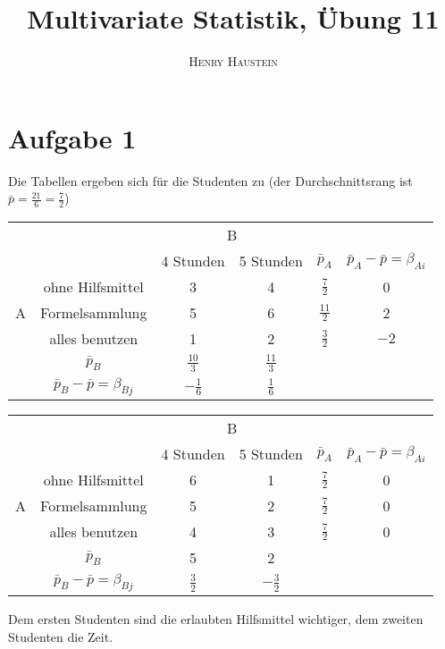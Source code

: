 \documentclass{article}
\title{\textbf{Multivariate Statistik, Übung 11}}
\author{\textsc{Henry Haustein}}
\date{}
\begin{document}
	\maketitle
	
	\section*{Aufgabe 1}
	Die Tabellen ergeben sich für die Studenten zu (der Durchschnittsrang ist $\bar{p}=\frac{21}{6}=\frac{7}{2}$)
	\begin{center}
		\begin{tabular}{cc|cc|c|c}
			&& \multicolumn{2}{c|}{B} & & \\
			&& 4 Stunden & 5 Stunden & $\bar{p}_A$ & $\bar{p}_A-\bar{p} = \beta_{Ai}$ \\
			\hline
			& ohne Hilfsmittel & 3 & 4 & $\frac{7}{2}$ & 0 \\
			A & Formelsammlung & 5 & 6 & $\frac{11}{2}$ & 2 \\
			& alles benutzen & 1 & 2 & $\frac{3}{2}$ & $-2$ \\
			\hline
			& $\bar{p}_B$ & $\frac{10}{3}$ & $\frac{11}{3}$ & \multicolumn{2}{c}{ } \\
			& $\bar{p}_B-\bar{p} = \beta_{Bj}$ & $-\frac{1}{6}$ & $\frac{1}{6}$ & \multicolumn{2}{c}{ }
		\end{tabular}
	\end{center}
	\begin{center}
		\begin{tabular}{cc|cc|c|c}
			&& \multicolumn{2}{c|}{B} & & \\
			&& 4 Stunden & 5 Stunden & $\bar{p}_A$ & $\bar{p}_A-\bar{p} = \beta_{Ai}$ \\
			\hline
			& ohne Hilfsmittel & 6 & 1 & $\frac{7}{2}$ & 0 \\
			A & Formelsammlung & 5 & 2 & $\frac{7}{2}$ & 0 \\
			& alles benutzen & 4 & 3 & $\frac{7}{2}$ & 0 \\
			\hline
			& $\bar{p}_B$ & 5 & 2 & \multicolumn{2}{c}{ } \\
			& $\bar{p}_B-\bar{p} = \beta_{Bj}$ & $\frac{3}{2}$ & $-\frac{3}{2}$ & \multicolumn{2}{c}{ }
		\end{tabular}
	\end{center}
	Dem ersten Studenten sind die erlaubten Hilfsmittel wichtiger, dem zweiten Studenten die Zeit.
	
\end{document}
